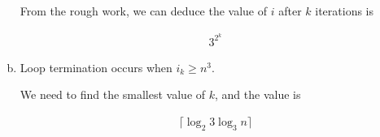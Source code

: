 \documentclass[12pt]{article}
\begin{document}
\begin{enumerate}[a.]
    From the rough work, we can deduce the value of $i$ after $k$ iterations
    is

    \setcounter{equation}{0}
    \begin{align}
        3^{2^k}
    \end{align}

    \item

    Loop termination occurs when $i_k \geq n^3$.

    \bigskip

    We need to find the smallest value of $k$, and the value is

    \setcounter{equation}{0}
    \begin{align}
        \lceil \log_2 3\log_3 n \rceil
    \end{align}

\end{enumerate}
\end{document}
